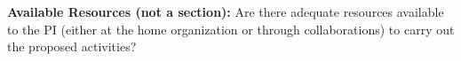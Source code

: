 \documentclass[12pt]{article}
\begin{document}
\noindent
\textbf{Available Resources (not a section):}
Are there adequate resources available to the PI (either at the home organization or through collaborations) to carry out the proposed activities?\\


\footnotesize


\end{document}
